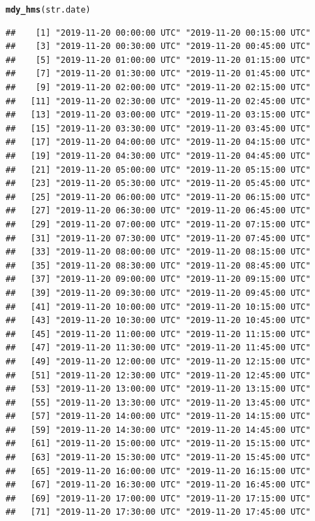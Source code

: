 \documentclass{article}\usepackage[]{graphicx}\usepackage[]{color}
\makeatletter
\newcommand{\hlstd}[1]{\textcolor[rgb]{0.345,0.345,0.345}{#1}}%
\newcommand{\hlkwd}[1]{\textcolor[rgb]{0.737,0.353,0.396}{\textbf{#1}}}%
\newenvironment{kframe}{%
 \def\at@end@of@kframe{}%
 \ifinner\ifhmode%
  \def\at@end@of@kframe{\end{minipage}}%
  \begin{minipage}{\columnwidth}%
 \fi\fi%
 \def\FrameCommand##1{\hskip\@totalleftmargin \hskip-\fboxsep
 \colorbox{shadecolor}{##1}\hskip-\fboxsep
     \hskip-\linewidth \hskip-\@totalleftmargin \hskip\columnwidth}%
 \MakeFramed {\advance\hsize-\width
   \@totalleftmargin\z@ \linewidth\hsize
   \@setminipage}}%
 {\par\unskip\endMakeFramed%
 \at@end@of@kframe}
\newenvironment{knitrout}{}{} %
\makeatother
\begin{document}
\begin{knitrout}
\begin{kframe}
{\ttfamily\noindent\itshape\color{messagecolor}{\#\# The following object is masked from 'package:base':\\\#\# \\\#\#\ \ \ \  date}}\begin{alltt}
\hlkwd{mdy_hms}\hlstd{(str.date)}
\end{alltt}
\begin{verbatim}
##    [1] "2019-11-20 00:00:00 UTC" "2019-11-20 00:15:00 UTC"
##    [3] "2019-11-20 00:30:00 UTC" "2019-11-20 00:45:00 UTC"
##    [5] "2019-11-20 01:00:00 UTC" "2019-11-20 01:15:00 UTC"
##    [7] "2019-11-20 01:30:00 UTC" "2019-11-20 01:45:00 UTC"
##    [9] "2019-11-20 02:00:00 UTC" "2019-11-20 02:15:00 UTC"
##   [11] "2019-11-20 02:30:00 UTC" "2019-11-20 02:45:00 UTC"
##   [13] "2019-11-20 03:00:00 UTC" "2019-11-20 03:15:00 UTC"
##   [15] "2019-11-20 03:30:00 UTC" "2019-11-20 03:45:00 UTC"
##   [17] "2019-11-20 04:00:00 UTC" "2019-11-20 04:15:00 UTC"
##   [19] "2019-11-20 04:30:00 UTC" "2019-11-20 04:45:00 UTC"
##   [21] "2019-11-20 05:00:00 UTC" "2019-11-20 05:15:00 UTC"
##   [23] "2019-11-20 05:30:00 UTC" "2019-11-20 05:45:00 UTC"
##   [25] "2019-11-20 06:00:00 UTC" "2019-11-20 06:15:00 UTC"
##   [27] "2019-11-20 06:30:00 UTC" "2019-11-20 06:45:00 UTC"
##   [29] "2019-11-20 07:00:00 UTC" "2019-11-20 07:15:00 UTC"
##   [31] "2019-11-20 07:30:00 UTC" "2019-11-20 07:45:00 UTC"
##   [33] "2019-11-20 08:00:00 UTC" "2019-11-20 08:15:00 UTC"
##   [35] "2019-11-20 08:30:00 UTC" "2019-11-20 08:45:00 UTC"
##   [37] "2019-11-20 09:00:00 UTC" "2019-11-20 09:15:00 UTC"
##   [39] "2019-11-20 09:30:00 UTC" "2019-11-20 09:45:00 UTC"
##   [41] "2019-11-20 10:00:00 UTC" "2019-11-20 10:15:00 UTC"
##   [43] "2019-11-20 10:30:00 UTC" "2019-11-20 10:45:00 UTC"
##   [45] "2019-11-20 11:00:00 UTC" "2019-11-20 11:15:00 UTC"
##   [47] "2019-11-20 11:30:00 UTC" "2019-11-20 11:45:00 UTC"
##   [49] "2019-11-20 12:00:00 UTC" "2019-11-20 12:15:00 UTC"
##   [51] "2019-11-20 12:30:00 UTC" "2019-11-20 12:45:00 UTC"
##   [53] "2019-11-20 13:00:00 UTC" "2019-11-20 13:15:00 UTC"
##   [55] "2019-11-20 13:30:00 UTC" "2019-11-20 13:45:00 UTC"
##   [57] "2019-11-20 14:00:00 UTC" "2019-11-20 14:15:00 UTC"
##   [59] "2019-11-20 14:30:00 UTC" "2019-11-20 14:45:00 UTC"
##   [61] "2019-11-20 15:00:00 UTC" "2019-11-20 15:15:00 UTC"
##   [63] "2019-11-20 15:30:00 UTC" "2019-11-20 15:45:00 UTC"
##   [65] "2019-11-20 16:00:00 UTC" "2019-11-20 16:15:00 UTC"
##   [67] "2019-11-20 16:30:00 UTC" "2019-11-20 16:45:00 UTC"
##   [69] "2019-11-20 17:00:00 UTC" "2019-11-20 17:15:00 UTC"
##   [71] "2019-11-20 17:30:00 UTC" "2019-11-20 17:45:00 UTC"

\end{verbatim}
\end{kframe}
\end{knitrout}
\end{document}

